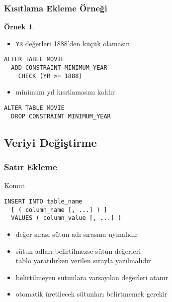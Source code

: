 \documentclass[dvipsnames]{beamer}
\theoremstyle{definition}
\theoremstyle{example}
\newtheorem{ornek}[theorem]{Örnek}
\theoremstyle{plain}
\begin{document}
\begin{frame}[fragile]
  \frametitle{Kısıtlama Ekleme Örneği}

  \begin{ornek}
    \begin{itemize}
      \item \texttt{YR} değerleri 1888'den küçük olamasın
    \end{itemize}

    \begin{lstlisting}
ALTER TABLE MOVIE
  ADD CONSTRAINT MINIMUM_YEAR
    CHECK (YR >= 1888)
    \end{lstlisting}

    \pause
    \begin{itemize}
      \item minimum yıl kısıtlamasını kaldır
    \end{itemize}

    \begin{lstlisting}
ALTER TABLE MOVIE
  DROP CONSTRAINT MINIMUM_YEAR
    \end{lstlisting}
  \end{ornek}
\end{frame}

\subsection{Veriyi Değiştirme}

\begin{frame}[fragile]
  \frametitle{Satır Ekleme}

  \begin{block}{Komut}
    \begin{lstlisting}
INSERT INTO table_name
  [ ( column_name [, ...] ) ]
  VALUES ( column_value [, ...] )
    \end{lstlisting}
  \end{block}

  \pause
  \begin{itemize}
    \item değer sırası sütun adı sırasına uymalıdır
    \item sütun adları belirtilmezse sütun değerleri\\
      tablo yaratılırken verilen sırayla yazılmalıdır
    \item belirtilmeyen sütunlara varsayılan değerleri atanır

    \pause
    \medskip
    \item otomatik üretilecek sütunları belirtmemek gerekir
  \end{itemize}
\end{frame}
\end{document}
